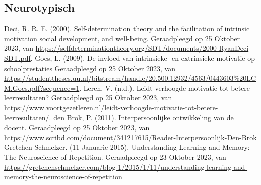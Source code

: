     
    \pagestyle{empty}
    \renewcommand{\refname}{Literatuurlijst}
    \begin{thebibliography}{9}
        \item[\bigskip\subsection*{Neurotypisch}]
                Deci, R. R. E. (2000). Self-determination theory and the facilitation of intrinsic motivation social development, and well-being. Geraadpleegd op 25 Oktober 2023, van \url{https://selfdeterminationtheory.org/SDT/documents/2000 RyanDeci SDT.pdf}.
                Goes, L. (2009). De invloed van intrinsieke- en extrinsieke motivatie op schoolprestaties Geraadpleegd op 25 Oktober 2023, van \url{https://studenttheses.uu.nl/bitstream/handle/20.500.12932/4563/0443603%20LCM.Goes.pdf?sequence=1}.
                Leren, V. (n.d.). Leidt verhoogde motivatie tot betere leerresultaten? Geraadpleegd op 25 Oktober 2023, van \url{https://www.voortgezetleren.nl/leidt-verhoogde-motivatie-tot-betere-leerresultaten/}.
                den Brok, P. (2011). Interpersoonlijke ontwikkeling van de docent. Geraadpleegd op 25 Oktober 2023, van \url{https://www.scribd.com/document/341217615/Reader-Interpersoonlijk-Den-Brok}
                Gretchen Schmelzer. (11 Januarie 2015). Understanding Learning and Memory: The Neuroscience of Repetition. Geraadpleegd op 23 Oktober 2023, van \url{https://gretchenschmelzer.com/blog-1/2015/1/11/understanding-learning-and-memory-the-neuroscience-of-repetition}

\end{thebibliography}
